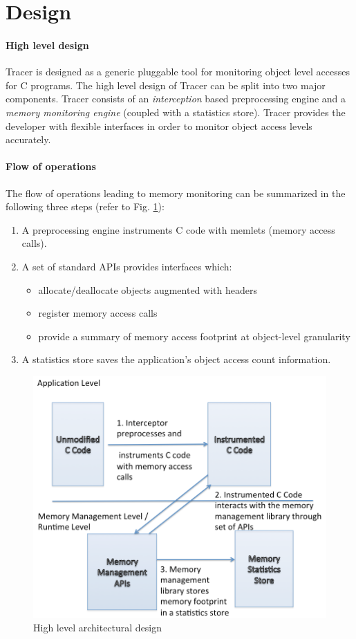 \section{Design}
\label{sec:design}
\paragraph{High level design}
Tracer is designed as a generic pluggable tool for monitoring object level accesses for C programs. The high level design of Tracer can be split into two major components. Tracer consists of an {\emph{interception}} based preprocessing engine and a {\emph{memory monitoring engine}} (coupled with a statistics store). Tracer provides the developer with flexible interfaces in order to monitor object access levels accurately. 

\paragraph{Flow of operations}
The flow of operations leading to memory monitoring can be summarized in the following three steps (refer to Fig. \ref{fig:architecture}):
\begin{enumerate}
\item A preprocessing engine instruments C code with memlets (memory access calls).
\item A set of standard APIs provides interfaces which:
\begin{itemize}
\item allocate/deallocate objects augmented with headers
\item register memory access calls
\item provide a summary of memory access footprint at object-level granularity
\end{itemize}
\item A statistics store saves the application's object access count information.
\end{enumerate}

\begin{figure}[!ht]
\caption{High level architectural design}
\label{fig:architecture}
\includegraphics[scale=0.25]{./images/architecture.png}
\end{figure}

